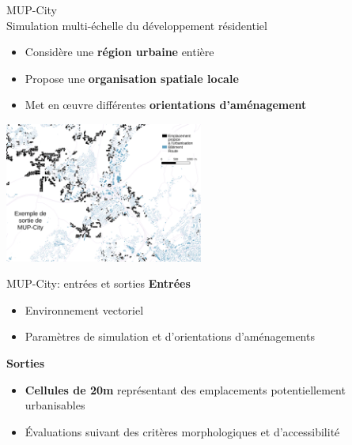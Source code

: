 \documentclass[xcolor=table]{beamer}
\begin{document}
\begin{frame}{MUP-City}
	\\
	Simulation multi-échelle du développement résidentiel 
	\begin{itemize}
		\item Considère une \textbf{région urbaine} entière
		\item Propose une \textbf{organisation spatiale locale}
		\item Met en œuvre différentes \textbf{orientations d'aménagement}
	\end{itemize}
	\includegraphics[width=6.5cm]{Images/ex-sorties-mup.png}
\end{frame}

\begin{frame}{MUP-City: entrées et sorties}
	\textbf{Entrées}
	\begin{itemize}
		\item Environnement vectoriel 
		\item Paramètres de simulation et d'orientations d'aménagements
	\end{itemize}
	\textbf{Sorties}
	\begin{itemize}
		\item \textbf{Cellules de 20m} représentant des emplacements potentiellement urbanisables
		\item Évaluations suivant des critères morphologiques et d'accessibilité
	\end{itemize}
	\begin{block}{}\end{block}
\end{frame}
\end{document}
